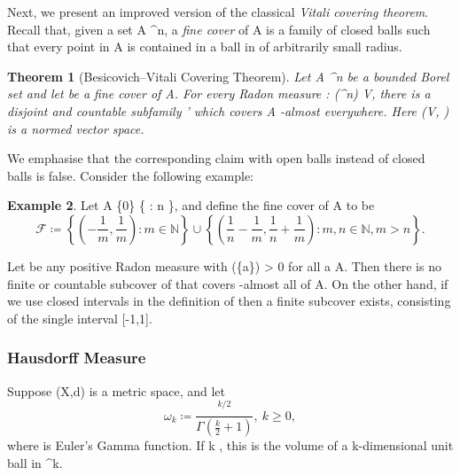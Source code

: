 \documentclass[a4paper, 11pt]{article}
\theoremstyle{plain}
\newtheorem{theorem}{Theorem}[section]
\theoremstyle{definition}
\newtheorem{example}[theorem]{Example}
\theoremstyle{remark}
\newcommand{\norm}[1]{\left\lVert#1\right\rVert}
\numberwithin{equation}{subsection}
\def\({}
\def\){}
\def\pi{}
\begin{document}
Next, we present an improved version of the classical \emph{Vitali covering theorem}. Recall that, given a set \(A \subset {}^{n}\), a \emph{fine cover} of \(A\) is a family \(\) of closed balls such that every point in \(A\) is contained in a ball in \(\) of arbitrarily small radius.

\begin{theorem}[Besicovich--Vitali Covering Theorem]
Let \(A \subset {}^{n}\) be a bounded Borel set and let \(\) be a fine cover of \(A\). For every Radon measure \(\mu : (^{n}) \rightarrow V\), there is a disjoint and countable subfamily \(' \subset {}\) which covers \(A\) \(\mu\)-almost everywhere. Here \((V, \norm{\cdot})\) is a normed vector space.
\end{theorem}

We emphasise that the corresponding claim with open balls instead of closed balls is false. Consider the following example:

\begin{example}
Let \(A \coloneq \{0\} \cup \left\{ : n \in {}\right\}\), and define the fine cover \(\) of \(A\) to be
\begin{equation}
\mathcal{F} \coloneq \left\{\left(-\frac{1}{m}, \frac{1}{m}\right) : m \in \mathbb{N}\right\} \cup \left\{\left(\frac{1}{n}-\frac{1}{m}, \frac{1}{n} + \frac{1}{m}\right) : m, n \in \mathbb{N}, m > n \right\}.
\end{equation}

Let \(\mu\) be any positive Radon measure with \(\mu(\{a\}) > 0\) for all \(a \in A\). Then there is no finite or countable subcover of \(\) that covers \(\mu\)-almost all of \(A\). On the other hand, if we use closed intervals in the definition of \(\) then a finite subcover exists, consisting of the single interval \([-1,1]\).
\end{example}

\subsubsection{Hausdorff Measure}

Suppose \((X,d)\) is a metric space, and let
\begin{equation}
\omega_k \coloneq \frac{\pi^{k/2}}{\Gamma\left(\frac{k}{2}+1\right)}, \ k \geqslant 0,
\end{equation}
where \(\Gamma\) is Euler's Gamma function. If \(k \in {}\), this is the volume of a \(k\)-dimensional unit ball in \(^k\).
\end{document}
